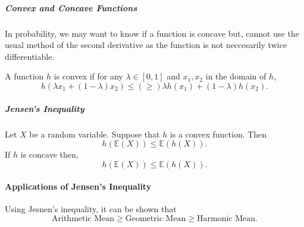 \subparagraph{Convex and Concave Functions}
In probability, we may want to know if a function is concave but,
cannot use the usual method of the second derivative as the
function is not neccesarily twice differentiable.

A function \(h\) is convex if for any \(\lambda\in[0, 1]\)
and \(x_1, x_2\) in the domain of \(h\),
\[
    h(\lambda x_1 + (1-\lambda)x_2)
    \leq (\geq)
    \lambda h(x_1) + (1 -\lambda) h(x_2).
\]

\subparagraph{Jensen's Inequality}
Let \(X\) be a random variable.
Suppose that \(h\) is a convex function. Then \[
    h(\mathbb{E}(X)) \leq \mathbb{E}(h(X)).
\]
If \(h\) is concave then, \[
    h(\mathbb{E}(X)) \leq \mathbb{E}(h(X)).
\]

\paragraph{Applications of Jensen's Inequality}
Using Jesnen's inequality, it can be shown that
\[
    \text{Arithmetic Mean} \geq \text{Geometric Mean} \geq \text{Harmonic Mean}.
\]
